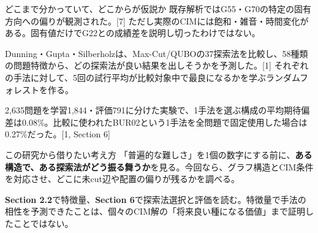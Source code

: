 \begin{caution}{どこまで分かっていて、どこからが仮説か}
既存解析ではG55・G70の特定の固有方向への偏りが観測された。[7] ただし実際のCIMには飽和・雑音・時間変化がある。固有値だけでG22との成績差を説明し切ったわけではない。
\end{caution}

\newpage
{}
Dunning・Gupta・Silberholzは、Max-Cut/QUBOの37探索法を比較し、58種類の問題特徴から、どの探索法が良い結果を出しそうかを予測した。[1] それぞれの手法に対して、5回の試行平均が比較対象中で最良になるかを学ぶランダムフォレストを作る。

\begin{center}
\end{center}

2,635問題を学習1,844・評価791に分けた実験で、1手法を選ぶ構成の平均期待偏差は0.08\%。比較に使われたBUR02という1手法を全問題で固定使用した場合は0.27\%だった。[1, Section 6]

\begin{point}{この研究から借りたい考え方}
「普遍的な難しさ」を1個の数字にする前に、\textbf{ある構造で、ある探索法がどう振る舞うか}を見る。今回なら、グラフ構造とCIM条件を対応させ、どこに未cut辺や配置の偏りが残るかを調べる。
\end{point}
\textbf{Section 2.2}で特徴量、\textbf{Section 6}で探索法選択と評価を読む。特徴量で手法の相性を予測できたことは、個々のCIM解の「将来良い種になる価値」まで証明したことではない。

